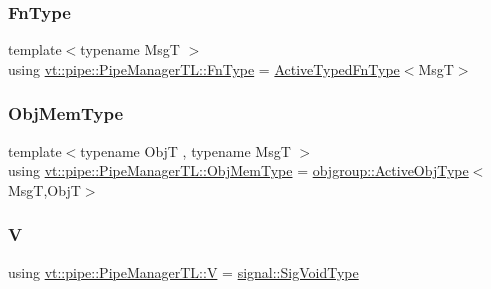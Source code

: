 \mbox{\label{structvt_1_1pipe_1_1_pipe_manager_t_l_ac2c474a68a93bbc8e1d86eb99dabf1dc}} 
\subsubsection{\texorpdfstring{Fn\+Type}{FnType}}
{\footnotesize\ttfamily template$<$typename MsgT $>$ \\
using \hyperlink{structvt_1_1pipe_1_1_pipe_manager_t_l_ac2c474a68a93bbc8e1d86eb99dabf1dc}{vt\+::pipe\+::\+Pipe\+Manager\+T\+L\+::\+Fn\+Type} =  \hyperlink{namespacevt_a54eefd5373739c7365058b0d22fea6e2}{Active\+Typed\+Fn\+Type}$<$MsgT$>$}

\mbox{\label{structvt_1_1pipe_1_1_pipe_manager_t_l_a1a8a2e05fd84f8ac7b7dda4b64e5abe5}} 
\subsubsection{\texorpdfstring{Obj\+Mem\+Type}{ObjMemType}}
{\footnotesize\ttfamily template$<$typename ObjT , typename MsgT $>$ \\
using \hyperlink{structvt_1_1pipe_1_1_pipe_manager_t_l_a1a8a2e05fd84f8ac7b7dda4b64e5abe5}{vt\+::pipe\+::\+Pipe\+Manager\+T\+L\+::\+Obj\+Mem\+Type} =  \hyperlink{namespacevt_1_1objgroup_a979bd9dc714fdacafc4b83f98271bc23}{objgroup\+::\+Active\+Obj\+Type}$<$MsgT,ObjT$>$}

\mbox{\label{structvt_1_1pipe_1_1_pipe_manager_t_l_a8d394521df58abfd90c1d81c998f22e3}} 
\subsubsection{\texorpdfstring{V}{V}}
{\footnotesize\ttfamily using \hyperlink{structvt_1_1pipe_1_1_pipe_manager_t_l_a8d394521df58abfd90c1d81c998f22e3}{vt\+::pipe\+::\+Pipe\+Manager\+T\+L\+::V} =  \hyperlink{namespacevt_1_1pipe_1_1signal_acbe257d1ae44f20fa9fd9b6ed3057caf}{signal\+::\+Sig\+Void\+Type}}



